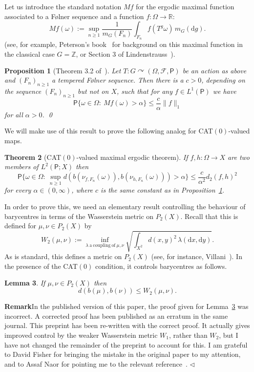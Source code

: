\documentclass{amsart}
\newtheorem{thm}{Theorem}[section]
\newtheorem{lem}[thm]{Lemma}
\newtheorem{prop}[thm]{Proposition}
\theoremstyle{remark}
\renewcommand{\rm}[1]{\mathrm{#1}}
\newcommand{\bbR}{\mathbb{R}}
\newcommand{\bbZ}{\mathbb{Z}}
\newcommand{\sfP}{\mathsf{P}}
\renewcommand{\d}{\mathrm{d}}
\newcommand{\F}{\mathcal{F}}
\renewcommand{\O}{\Omega}
\renewcommand{\a}{\alpha}
\renewcommand{\l}{\lambda}
\newcommand{\w}{\omega}
\newcommand{\fin}{\nolinebreak\hspace{\stretch{1}}$\lhd$}
\begin{document}
Let us introduce the standard notation $Mf$ for the ergodic maximal
function associated to a F\o lner sequence and a function $f:\O\to
\bbR$:
\[Mf(\w) := \sup_{n\geq 1}\frac{1}{m_G(F_n)}\int_{F_n}f(T^g\w)\,m_G(\d g).\]
(see, for example, Peterson's book~\cite{Pet83} for background on
this maximal function in the classical case $G = \bbZ$, or Section 3
of Lindenstrauss~\cite{Lin01}).

\begin{prop}[Theorem 3.2 of~\cite{Lin01}]\label{prop:max-erg-th}
Let $T:G\curvearrowright (\O,\F,\sfP)$ be an action as above and
$(F_n)_{n\geq 1}$ a tempered F\o lner sequence.  Then there is a $c
> 0$, depending on the sequence $(F_n)_{n\geq 1}$ but not on $X$,
such that for any $f \in L^1(\sfP)$ we have
\[\sfP\{\w\in \O:\ Mf(\w) > \a\} \leq \frac{c}{\a}\|f\|_1\]
for all $\a > 0$. \qed
\end{prop}

We will make use of this result to prove the following analog for
CAT$(0)$-valued maps.

\begin{thm}[CAT$(0)$-valued maximal ergodic
theorem]\label{thm:CAT0-max-erg-th} If $f,h:\O\to X$ are two members
of $L^2(\sfP;X)$ then
\[\sfP\big\{\w\in\O:\ \sup_{n\geq 1}d(b(\nu_{f,F_n}(\w)),b(\nu_{h,F_n}(\w))) > \a\big\} \leq \frac{c}{\a^2}d_2(f,h)^2\]
for every $\a \in (0,\infty)$, where $c$ is the same constant as in
Proposition~\ref{prop:max-erg-th}.
\end{thm}

In order to prove this, we need an elementary result controlling the
behaviour of barycentres in terms of the Wasserstein metric on
$P_2(X)$.  Recall that this is defined for $\mu,\nu \in P_2(X)$ by
\[W_2(\mu,\nu) := \inf_{\l\ \rm{a}\ \rm{coupling}\ \rm{of}\ \mu,\nu}\sqrt{\int_{X^2}d(x,y)^2\,\l(\d x,\d y)}.\]
As is standard, this defines a metric on $P_2(X)$ (see, for
instance, Villani~\cite{Vil03}).  In the presence of the
CAT$(0)$ condition, it controls barycentres as follows.

\begin{lem}\label{lem:Wasser}
If $\mu,\nu \in P_2(X)$ then
\[d(b(\mu),b(\nu))\leq W_2(\mu,\nu).\]
\end{lem}

\textbf{Remark}\quad In the published version of this paper, the proof given for Lemma~\ref{lem:Wasser} was incorrect.  A corrected proof has been published as an erratum in the same journal.  This preprint has been re-written with the correct proof.  It actually gives improved control by the weaker Wasserstein metric $W_1$, rather than $W_2$, but I have not changed the remainder of the preprint to account for this. I am grateful to David Fisher for bringing the mistake in the original paper to my attention, and to Assaf Naor for pointing me to the relevant reference~\cite{LanPavSch00}. \fin
\end{document}
